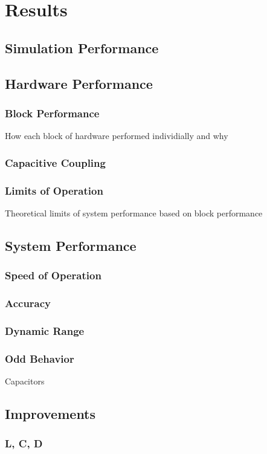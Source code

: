 \chapter{Results}

\section{Simulation Performance}

\section{Hardware Performance}
\subsection{Block Performance}
How each block of hardware performed individially and why
\subsection{Capacitive Coupling}
\subsection{Limits of Operation}
Theoretical limits of system performance based on block performance

\section{System Performance}
\subsection{Speed of Operation}
\subsection{Accuracy}
\subsection{Dynamic Range}
\subsection{Odd Behavior}
Capacitors

\section{Improvements}
\subsection{L, C, D}
